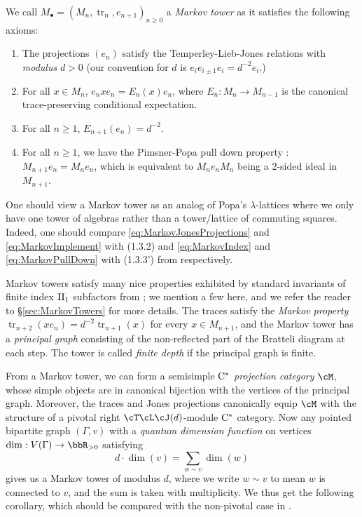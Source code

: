 \documentclass[11pt]{article}
\theoremstyle{plain}
\theoremstyle{definition}
\DeclareMathOperator{\tr}{tr}
\newcommand{\Cstar}{\rm{C^*}}
\begin{document}
We call $M_\bullet = (M_n, \tr_n, e_{n+1})_{n\geq 0}$ 
a \emph{Markov tower} as it satisfies the following axioms:
\begin{enumerate}[label={\rm(M\arabic*)}]
\item
The projections $(e_n)$ satisfy the Temperley-Lieb-Jones relations with \emph{modulus} $d>0$ (our convention for $d$ is $e_ie_{i\pm 1}e_i = d^{-2} e_i$.)
\item
For all $x\in M_n$, $e_n xe_n = E_n(x) e_n$, where $E_n: M_n \to M_{n-1}$ is the canonical trace-preserving conditional expectation.
\item
For all $n\geq 1$, $E_{n+1}(e_n) = d^{-2}$.
\item
For all $n\geq 1$, we have the Pimsner-Popa pull down property \cite{MR860811}: $M_{n+1} e_n = M_n e_n$, which is equivalent to $M_n e_n M_n$ being a 2-sided ideal in $M_{n+1}$.
\end{enumerate}
One should view a Markov tower as an analog of Popa's $\lambda$-lattices \cite{MR1334479} where we only have one tower of algebras rather than a tower/lattice of commuting squares.
Indeed, one should compare \ref{eq:MarkovJonesProjections} and \ref{eq:MarkovImplement} with (1.3.2) and \ref{eq:MarkovIndex} and \ref{eq:MarkovPullDown} with (1.3.3') from \cite{MR1334479} respectively.

Markov towers satisfy many nice properties exhibited by standard invariants of finite index ${\rm II}_1$ subfactors from \cite[Ch.~4]{MR999799}; we mention a few here, and we refer the reader to \S\ref{sec:MarkovTowers} for more details.
The traces satisfy the \emph{Markov property} $\tr_{n+2}(x e_n) = d^{-2}\tr_{n+1}(x)$ for every $x\in M_{n+1}$, and the Markov tower has a \emph{principal graph} consisting of the non-reflected part of the Bratteli diagram at each step.
The tower is called \emph{finite depth} if the principal graph is finite.

From a Markov tower, we can form a semisimple $\Cstar$ \emph{projection category} $\cM$, whose simple objects are in canonical bijection with the vertices of the principal graph.
Moreover, the traces and Jones projections canonically equip $\cM$ with the structure of a pivotal right $\cT\cL\cJ(d)$-module $\Cstar$ category.
Now any pointed bipartite graph $(\Gamma,v)$ with a \emph{quantum dimension function} on vertices $\dim: V(\Gamma) \to \bbR_{>0}$ satisfying
$$
d\cdot \dim(v) = \sum_{w\sim v} \dim(w)
$$
gives us a Markov tower of modulus $d$, where we write $w\sim v$ to mean $w$ is connected to $v$, and the sum is taken with multiplicity.
We thus get the following corollary, which should be compared with the non-pivotal case in \cite{MR3420332}.
\end{document}

